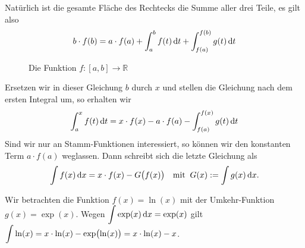 Nat\"urlich ist die gesamte Fl\"ache des Rechtecks die Summe aller drei Teile, es gilt also
\begin{equation}
  \label{eq:umkehr0}
  b\cdot f(b) = a\cdot f(a) + \int_a^b f(t)\, \textrm{d} t + \int_{f(a)}^{f(b)} g(t)\, \textrm{d} t 
\end{equation}


\begin{figure}[!h]
  \centering
  \caption{Die Funktion $f:[a,b] \rightarrow\mathbb{R}$}
  \label{fig:umkehr.eps}
\end{figure}

Ersetzen wir in dieser Gleichung  $b$ durch $x$ und stellen die Gleichung nach dem ersten
Integral um, so erhalten wir
\begin{equation}
  \label{eq:umkehr}
  \int_a^x f(t)\, \textrm{d} t = x\cdot f(x) - a\cdot f(a) - \int_{f(a)}^{f(x)} g(t)\, \textrm{d} t 
\end{equation}
Sind wir nur an Stamm-Funktionen interessiert, so k\"onnen wir den konstanten Term $a\cdot f(a)$
weglassen.  Dann schreibt sich die letzte Gleichung als
\begin{equation}
  \label{eq:umkehr1}
  \int f(x)\, \textrm{d} x = x\cdot f(x) - G\bigl(f(x)\bigr) \quad \mbox{mit}\;\; G(x) := \int g(x)\, \textrm{d} x. 
\end{equation}

\example 
Wir betrachten die Funktion $f(x) = \ln(x)$ mit der Umkehr-Funktion 
$g(x) = \exp(x)$.  Wegen $\displaystyle\int \exp(x)\,\textrm{d} x = \exp(x)$ gilt 
\\[0.3cm]
\hspace*{1.3cm}
$\displaystyle\int \ln(x) = x\cdot \ln(x) - \exp\bigl(\ln(x)\bigr) = x\cdot \ln(x) - x$. \eox

